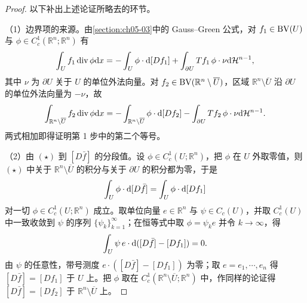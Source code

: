 \documentclass[../../main.tex]{subfiles}%
\begin{document}
\begin{proof}
以下补出上述论证所略去的环节。

（1）边界项的来源。由\cref{section:ch05-03}中的 Gauss--Green 公式，对 $f_1\in\mathrm{BV}(U)$ 与 $\phi\in C_c^1(\mathbb{R}^n;\mathbb{R}^n)$ 有%
\begin{align*}
\int_U f_1\operatorname{div}\phi\mathrm{d} x=-\int_U\phi\cdot\mathrm{d}[Df_1]+\int_{\partial U}Tf_1\,\phi\cdot\nu\mathrm{d}\mathcal{H}^{n-1},
\end{align*}
其中 $\nu$ 为 $\partial U$ 关于 $U$ 的单位外法向量。对 $f_2\in\mathrm{BV}(\mathbb{R}^n\setminus\overline{U})$，区域 $\mathbb{R}^n\setminus\overline{U}$ 沿 $\partial U$ 的单位外法向量为 $-\nu$，故
\begin{align*}
\int_{\mathbb{R}^n\setminus\overline{U}}f_2\operatorname{div}\phi\mathrm{d} x=-\int_{\mathbb{R}^n\setminus\overline{U}}\phi\cdot\mathrm{d}[Df_2]-\int_{\partial U}Tf_2\,\phi\cdot\nu\mathrm{d}\mathcal{H}^{n-1}.
\end{align*}
两式相加即得证明第 1 步中的第二个等号。

（2）由 $(\star)$ 到 $[D\bar f]$ 的分段值。设 $\phi\in C_c^1(U;\mathbb{R}^n)$，把 $\phi$ 在 $U$ 外取零值，则 $(\star)$ 中关于 $\mathbb{R}^n\setminus\overline{U}$ 的积分与关于 $\partial U$ 的积分都为零，于是
\begin{align*}
\int_U\phi\cdot\mathrm{d}[D\bar f]=\int_U\phi\cdot\mathrm{d}[Df_1]
\end{align*}
对一切 $\phi\in C_c^1(U;\mathbb{R}^n)$ 成立。取单位向量 $e\in\mathbb{R}^n$ 与 $\psi\in C_c(U)$，并取 $C_c^1(U)$ 中一致收敛到 $\psi$ 的序列 $\{\psi_k\}_{k=1}^{\infty}$；在恒等式中取 $\phi=\psi_ke$ 并令 $k\to\infty$，得
\begin{align*}
\int_U\psi\,e\cdot\mathrm{d}([D\bar f]-[Df_1])=0.
\end{align*}
由 $\psi$ 的任意性，带号测度 $e\cdot([D\bar f]-[Df_1])$ 为零；取 $e=e_1,\cdots,e_n$ 得 $[D\bar f]=[Df_1]$ 于 $U$ 上。把 $\phi$ 取在 $C_c^1(\mathbb{R}^n\setminus\overline{U};\mathbb{R}^n)$ 中，作同样的论证得 $[D\bar f]=[Df_2]$ 于 $\mathbb{R}^n\setminus\overline{U}$ 上。


\end{proof}
\end{document}
